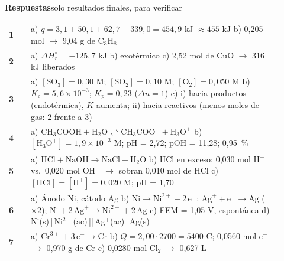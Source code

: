 \documentclass[11pt]{article}
\begin{document}
\newpage
{\Large\bfseries Respuestas}\hfill{\small\color{gray}solo resultados finales, para verificar}\par
\vspace{2pt}{\color{NavyBlue}\rule{\linewidth}{0.8pt}}\par\vspace{6pt}
\renewcommand{\arraystretch}{1.5}
\begin{tabular}{@{}>{\bfseries\color{NavyBlue}}l >{\raggedright\arraybackslash}p{0.92\linewidth}@{}}
1 & a) \(q = 3{,}1 + 50{,}1 + 62{,}7 + 339{,}0 = 454{,}9\) kJ \(\approx 455\) kJ \quad b) 0,205 mol \(\rightarrow\) 9,04 g de C\(_3\)H\(_8\)\\
2 & a) \(\Delta H^\circ_r = -125{,}7\) kJ \quad b) exotérmico \quad c) 2,52 mol de CuO \(\rightarrow\) 316 kJ liberados\\
3 & a) \([\text{SO}_3] = 0{,}30\) M; \([\text{SO}_2] = 0{,}10\) M; \([\text{O}_2] = 0{,}050\) M \quad b) \(K_c = 5{,}6\times10^{-3}\); \(K_p = 0{,}23\) (\(\Delta n = 1\)) \quad c) i) hacia productos (endotérmica), \(K\) aumenta; ii) hacia reactivos (menos moles de gas: 2 frente a 3)\\
4 & a) \(\text{CH}_3\text{COOH} + \text{H}_2\text{O} \rightleftharpoons \text{CH}_3\text{COO}^- + \text{H}_3\text{O}^+\) \quad b) \([\text{H}_3\text{O}^+] = 1{,}9\times10^{-3}\) M; pH = 2,72; pOH = 11,28; 0,95~\%\\
5 & a) \(\text{HCl} + \text{NaOH} \rightarrow \text{NaCl} + \text{H}_2\text{O}\) \quad b) HCl en exceso: 0,030 mol H\(^+\) vs.\ 0,020 mol OH\(^-\) \(\rightarrow\) sobran 0,010 mol de HCl \quad c) \([\text{HCl}] = [\text{H}^+] = 0{,}020\) M; pH = 1,70\\
6 & a) Ánodo Ni, cátodo Ag \quad b) \(\text{Ni} \rightarrow \text{Ni}^{2+} + 2\,\text{e}^-\); \(\text{Ag}^+ + \text{e}^- \rightarrow \text{Ag}\) (\(\times 2\)); \(\text{Ni} + 2\,\text{Ag}^+ \rightarrow \text{Ni}^{2+} + 2\,\text{Ag}\) \quad c) FEM = 1,05 V, espontánea \quad d) Ni(s)\,|\,Ni\(^{2+}\)(ac)\,||\,Ag\(^{+}\)(ac)\,|\,Ag(s)\\
7 & a) \(\text{Cr}^{3+} + 3\,\text{e}^- \rightarrow \text{Cr}\) \quad b) \(Q = 2{,}00 \cdot 2700 = 5400\) C; 0,0560 mol e\(^-\) \(\rightarrow\) 0,970 g de Cr \quad c) 0,0280 mol Cl\(_2\) \(\rightarrow\) 0,627 L\\
\end{tabular}
\end{document}
